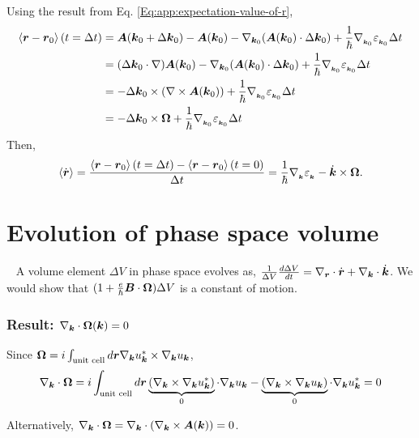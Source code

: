 \documentclass{report}
\renewcommand\vec[1]{\ensuremath\boldsymbol{#1}} %
\begin{document}
Using the result from Eq. \eqref{Eq:app:expectation-value-of-r},
$$
\begin{aligned}
\expval{\vec{r} - \vec{r}_0}(t=\Delta t) &= \vec{A}(\vec{k}_0 + \Delta \vec{k}_0) - \vec{A}(\vec{k}_0) - \nabla_{\vec{k}_0}(\vec{A}(\vec{k}_0)\cdot \Delta \vec{k}_0) + \frac{1}{\hbar} \nabla_{_{\vec{k}_0}} \varepsilon_{_{\vec{k}_0}} \Delta t \\
&= (\Delta \vec{k}_0 \cdot \nabla) \vec{A}(\vec{k}_0) - \nabla_{\vec{k}_0}(\vec{A}(\vec{k}_0)\cdot \Delta \vec{k}_0) + \frac{1}{\hbar} \nabla_{_{\vec{k}_0}} \varepsilon_{_{\vec{k}_0}} \Delta t \\
&= -\Delta \vec{k}_0 \times (\nabla \times \vec{A}(\vec{k}_0)) + \frac{1}{\hbar} \nabla_{_{\vec{k}_0}} \varepsilon_{_{\vec{k}_0}} \Delta t \\
&= -\Delta \vec{k}_0 \times \vec{\Omega} + \frac{1}{\hbar} \nabla_{_{\vec{k}_0}} \varepsilon_{_{\vec{k}_0}} \Delta t \\
\end{aligned}
$$
Then, $$\expval{\dot{\vec{r}}} = \frac{\expval{\vec{r} - \vec{r}_0}(t=\Delta t) - \expval{\vec{r} - \vec{r}_0}(t=0)}{\Delta t} = \frac{1}{\hbar} \nabla_{_{\vec{k}}} \varepsilon_{_{\vec{k}}} -\dot{\vec{k}} \times \vec{\Omega} .$$
\chapter{Evolution of phase space volume}~\label{app:phase-space-volume-evolution}
A volume element $\Delta V$ in phase space evolves as, $\frac{1}{\Delta V} \frac{d \Delta V}{dt} = \nabla_{\vec{r}}\cdot \dot{\vec{r}} + \nabla_{\vec{k}}\cdot \dot{\vec{k}}$.
We would show that $(1 + \frac{e}{\hbar} \vec{B}\cdot \vec{\Omega}) \Delta V$ is a constant of motion.

\subsection{Result: $\nabla_{\vec{k}} \cdot \vec{\Omega}(\vec{k}) = 0$}
Since $\vec{\Omega} = i \int_{\text{unit cell}} d\vec{r} \nabla_{\vec{k}} u_{\vec{k}}^* \times \nabla_{\vec{k}} u_{\vec{k}}$, 
$$\nabla_{\vec{k}} \cdot \vec{\Omega} = i \int_{\text{unit cell}} d\vec{r} \underbrace{(\nabla_{\vec{k}} \times \nabla_{\vec{k}} u_{\vec{k}}^*)}_0 \cdot \nabla_{\vec{k}} u_{\vec{k}} - \underbrace{(\nabla_{\vec{k}} \times \nabla_{\vec{k}} u_{\vec{k}})}_0 \cdot \nabla_{\vec{k}} u_{\vec{k}}^* = 0$$

Alternatively, $\nabla_{\vec{k}} \cdot \vec{\Omega} = \nabla_{\vec{k}} \cdot \left(\nabla_{\vec{k}} \times \vec{A} (\vec{k})\right) =0$.
\end{document}
